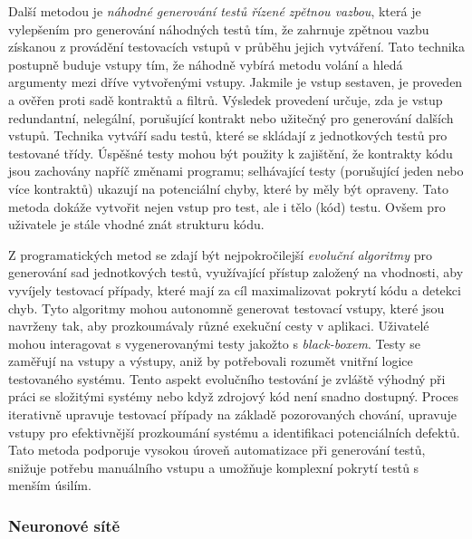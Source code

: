 \documentclass[12pt]{article}
\begin{document}
            Další metodou je \textit{náhodné generování testů řízené zpětnou vazbou}, která je vylepšením pro generování náhodných testů tím, že zahrnuje zpětnou vazbu získanou z provádění testovacích vstupů v průběhu jejich vytváření. Tato technika postupně buduje vstupy tím, že náhodně vybírá metodu volání a hledá argumenty mezi dříve vytvořenými vstupy. Jakmile je vstup sestaven, je proveden a ověřen proti sadě kontraktů a filtrů. Výsledek provedení určuje, zda je vstup redundantní, nelegální, porušující kontrakt nebo užitečný pro generování dalších vstupů. Technika vytváří sadu testů, které se skládají z jednotkových testů pro testované třídy. Úspěšné testy mohou být použity k zajištění, že kontrakty kódu jsou zachovány napříč změnami programu; selhávající testy (porušující jeden nebo více kontraktů) ukazují na potenciální chyby, které by měly být opraveny. Tato metoda dokáže vytvořit nejen vstup pro test, ale i tělo (kód) testu. Ovšem pro uživatele je stále vhodné znát strukturu kódu. \cite{FeedbackDirectedRT}

            Z programatických metod se zdají být nejpokročilejší \emph{evoluční algoritmy} pro generování sad jednotkových testů, využívající přístup založený na vhodnosti, aby vyvíjely testovací případy, které mají za cíl maximalizovat pokrytí kódu a detekci chyb. Tyto algoritmy mohou autonomně generovat testovací vstupy, které jsou navrženy tak, aby prozkoumávaly různé exekuční cesty v aplikaci. Uživatelé mohou interagovat s vygenerovanými testy jakožto s \textit{black-boxem}. Testy se zaměřují na vstupy a výstupy, aniž by potřebovali rozumět vnitřní logice testovaného systému. Tento aspekt evolučního testování je zvláště výhodný při práci se složitými systémy nebo když zdrojový kód není snadno dostupný. Proces iterativně upravuje testovací případy na základě pozorovaných chování, upravuje vstupy pro efektivnější prozkoumání systému a identifikaci potenciálních defektů. Tato metoda podporuje vysokou úroveň automatizace při generování testů, snižuje potřebu manuálního vstupu a umožňuje komplexní pokrytí testů s menším úsilím. %

            \subsubsection{Neuronové sítě}

    
\end{document}
